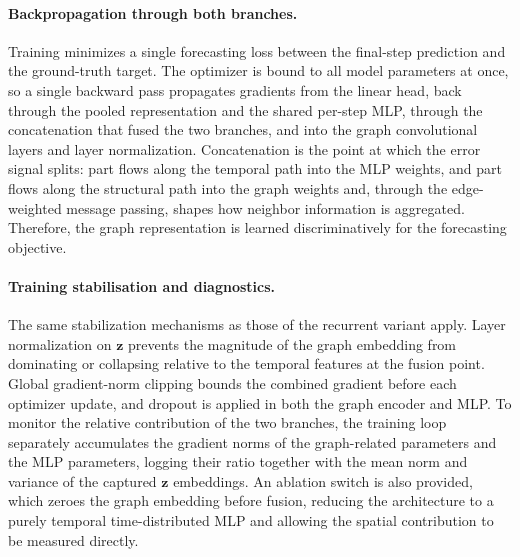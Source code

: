 \paragraph{Backpropagation through both branches.}
Training minimizes a single forecasting loss between the final-step prediction and the ground-truth target. The optimizer is bound to all model parameters at once, so a single backward pass propagates gradients from the linear head, back through the pooled representation and the shared per-step MLP, through the concatenation that fused the two branches, and into the graph convolutional layers and layer normalization. Concatenation is the point at which the error signal splits: part flows along the temporal path into the MLP weights, and part flows along the structural path into the graph weights and, through the edge-weighted message passing, shapes how neighbor information is aggregated. Therefore, the graph representation is learned discriminatively for the forecasting objective.

\paragraph{Training stabilisation and diagnostics.}
The same stabilization mechanisms as those of the recurrent variant apply. Layer normalization on $\mathbf{z}$ prevents the magnitude of the graph embedding from dominating or collapsing relative to the temporal features at the fusion point. Global gradient-norm clipping bounds the combined gradient before each optimizer update, and dropout is applied in both the graph encoder and MLP. To monitor the relative contribution of the two branches, the training loop separately accumulates the gradient norms of the graph-related parameters and the MLP parameters, logging their ratio together with the mean norm and variance of the captured $\mathbf{z}$ embeddings. An ablation switch is also provided, which zeroes the graph embedding before fusion, reducing the architecture to a purely temporal time-distributed MLP and allowing the spatial contribution to be measured directly.

